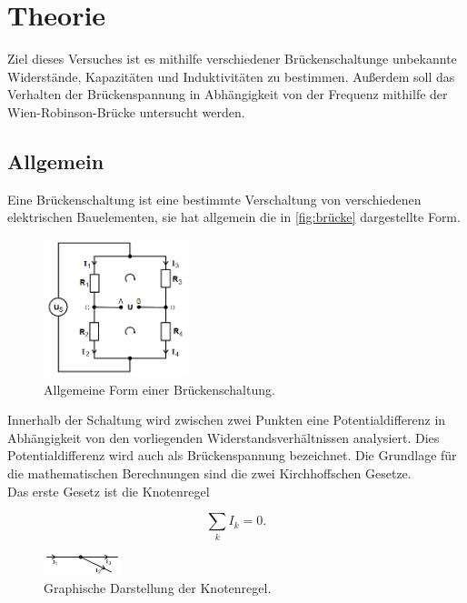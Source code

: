 \section{Theorie}
\label{sec:Theorie}
Ziel dieses Versuches ist es mithilfe verschiedener Brückenschaltunge unbekannte Widerstände, Kapazitäten und Induktivitäten zu bestimmen.
Außerdem soll das Verhalten der Brückenspannung in Abhängigkeit von der Frequenz mithilfe der Wien-Robinson-Brücke untersucht werden.

\subsection{Allgemein}
\label{subsec:allgemein}
Eine Brückenschaltung ist eine bestimmte Verschaltung von verschiedenen elektrischen Bauelementen, sie hat allgemein die in \autoref{fig:brücke} dargestellte Form.

\begin{figure}[H]
    \centering
    \includegraphics[height=4cm]{build/allgemein.PNG}
    \caption{Allgemeine Form einer Brückenschaltung.\cite[216]{V302}}
    \label{fig:brücke}
\end{figure}

\noindent Innerhalb der Schaltung wird zwischen zwei Punkten eine Potentialdifferenz in Abhängigkeit von den vorliegenden Widerstandsverhältnissen analysiert.
Dies Potentialdifferenz wird auch als Brückenspannung bezeichnet.
Die Grundlage für die mathematischen Berechnungen sind die zwei Kirchhoffschen Gesetze.\\
Das erste Gesetz ist die Knotenregel

\begin{equation}
    \sum_k I_k = 0 .
    \label{eqn:knoten}
\end{equation}

\begin{figure}[H]
    \centering
    \includegraphics[width=0.2\textwidth]{build/knoten.PNG}
    \caption{Graphische Darstellung der Knotenregel.\cite[217]{V302}}
    \label{fig:knoten}
\end{figure}

